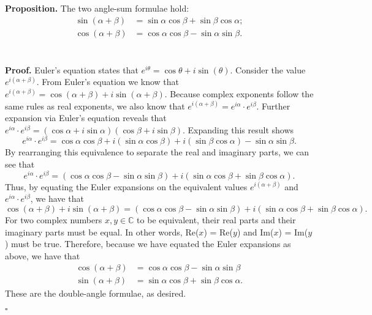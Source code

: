 \documentclass[12pt]{exam}
\begin{document}
\begin{questions}


\question
\textbf{Proposition.} The two angle-sum formulae hold:
\begin{align*}
\sin (\alpha + \beta) &= \sin\alpha\cos\beta + \sin\beta\cos\alpha ; \\
\cos(\alpha + \beta) &= \cos\alpha\cos\beta - \sin\alpha\sin\beta.
\end{align*}
\\
\\\textbf{Proof.} Euler's equation states that $e^{i\theta} = \cos{\theta} + i\sin(\theta)$. Consider the value $e^{i(\alpha + \beta)}$. From Euler's equation we know that $e^{i(\alpha + \beta)} = \cos(\alpha + \beta) + i\sin(\alpha + \beta)$. Because complex exponents follow the same rules as real exponents, we also know that $e^{i(\alpha + \beta)} = e^{i\alpha} \cdot e^{i\beta}$. Further expansion via Euler's equation reveals that $e^{i\alpha} \cdot e^{i\beta} = (\cos\alpha + i\sin\alpha)(\cos\beta + i\sin\beta)$. Expanding this result shows 
\begin{equation*}
e^{i\alpha} \cdot e^{i\beta} = \cos\alpha\cos\beta + i(\sin\alpha\cos\beta) + i(\sin\beta\cos\alpha) - \sin\alpha\sin\beta.
\end{equation*}
By rearranging this equivalence to separate the real and imaginary parts, we can see that 
\begin{equation*}
e^{i\alpha} \cdot e^{i\beta} = (\cos\alpha\cos\beta - \sin\alpha\sin\beta) + i(\sin\alpha\cos\beta + \sin\beta\cos\alpha) .
\end{equation*}
Thus, by equating the Euler expansions on the equivalent values $e^{i(\alpha + \beta)}$ and $e^{i\alpha} \cdot e^{i\beta}$, we have that 
\begin{equation*}
\cos(\alpha + \beta) + i\sin(\alpha + \beta) = (\cos\alpha\cos\beta - \sin\alpha\sin\beta) + i(\sin\alpha\cos\beta + \sin\beta\cos\alpha) .
\end{equation*}
For two complex numbers $x,y \in \mathbb{C}$ to be equivalent, their real parts and their imaginary parts must be equal. In other words, Re($x$) = Re($y$) and Im($x$) = Im($y$) must be true. Therefore, because we have equated the Euler expansions as above, we have that
 \begin{align*}
\cos(\alpha + \beta) &= \cos\alpha\cos\beta - \sin\alpha\sin\beta \\
\sin(\alpha + \beta) &= \sin\alpha\cos\beta + \sin\beta\cos\alpha.
\end{align*}
These are the double-angle formulae, as desired.
\begin{flushright}
$\square$
\end{flushright}


\end{questions}
\end{document}
